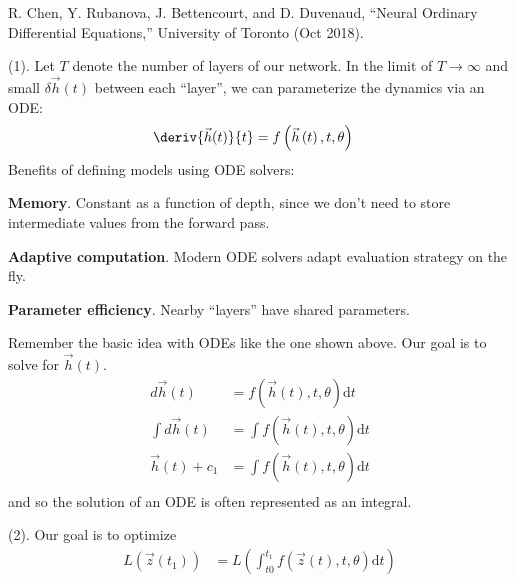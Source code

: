 \documentclass[11pt]{article}
\begin{document}
\vspace{-1em}
{\footnotesize R. Chen, Y. Rubanova, J. Bettencourt, and D. Duvenaud, ``Neural Ordinary Differential Equations,'' University of Toronto  (Oct 2018).}

\p {} (1). Let $T$ denote the number of layers of our network. In the limit of $T \rightarrow \infty$ and small $\delta \vec{h}(t)$ between each ``layer'', we can parameterize the dynamics via an ODE:
\begin{align}
	\deriv{\vec{h}(t)}{t}
		&= f\left(
			\vec{h}\left(t \right), t, \theta	 
		\right) \label{eq:neural-ode-1}
\end{align}
Benefits of defining models using ODE solvers:
\begin{compactitem}
	\item \textbf{Memory}. Constant as a function of depth, since we don't need to store intermediate values from the forward pass. 
	
	\item \textbf{Adaptive computation}. Modern ODE solvers adapt evaluation strategy on the fly. 
	
	\item \textbf{Parameter efficiency}. Nearby ``layers'' have shared parameters. 
\end{compactitem}

\begin{example}
	Remember the basic idea with ODEs like the one shown above. Our goal is to solve for $\vec{h}(t)$. 
	\begin{align}
		d\vec{h}(t) 
			&= f\left(\vec{h}\left(t \right), t, \theta	 \right) \mathrm{d}t \\
		\int d\vec{h}(t) 
			&= \int f\left(\vec{h}\left(t \right), t, \theta	 \right) \mathrm{d}t \\
		\vec{h}(t) + c_1
			&= \int f\left(\vec{h}\left(t \right), t, \theta	 \right) \mathrm{d}t \\
	\end{align}
	and so the solution of an ODE is often represented as an integral. 
\end{example}


\p {} (2). Our goal is to optimize 
\begin{align}
	L(\vec{z}(t_1))
		&= L \left(
			\int_{t0}^{t_1} f(\vec{z}(t), t, \theta) \mathrm{d}t 
		\right)
\end{align}
\end{document}

